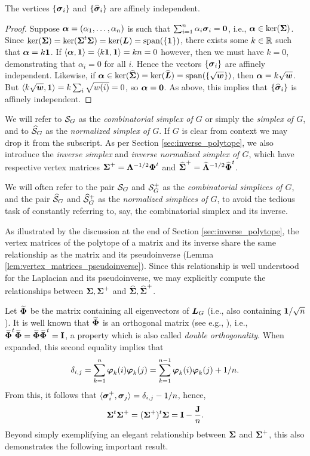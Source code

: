 \begin{lemma}
\label{lem:sv_affine_indep}
The vertices $\{\vb*{\sigma}_i\}$  and $\{\widehat{\vb*{\sigma}}_i\}$ are affinely independent. 
\end{lemma}
\begin{proof}
Suppose $\vb*{\alpha} = (\alpha_1,\dots,\alpha_n)$ is such that 
$\sum_{i=1}^n \alpha_i\vb*{\sigma}_i = \vb{0}$, i.e., $\vb*{\alpha}\in\ker(\boldsymbol{\Sigma})$. Since $\ker(\boldsymbol{\Sigma})=\ker(\boldsymbol{\Sigma}^t\boldsymbol{\Sigma})=\ker(\vb*{L})=\textnormal{span}(\{\vb{1}\})$, there exists some $k\in \mathbb{R}$ such that $\vb*{\alpha}=k\vb{1}$. If $\langle \vb*{\alpha},\vb{1}\rangle = \langle k\vb{1},\vb{1}\rangle=kn=0$ however, then we must have $k=0$, demonstrating that $\alpha_i=0$ for all $i$. Hence the vectors $\{\vb*{\sigma}_i\}$ are affinely independent. Likewise, if $\vb*{\alpha}\in\ker(\widehat{\boldsymbol{\Sigma}})=\ker(\widehat{\vb*{L}})=\textnormal{span}(\{\sqrt{\vb*{w}}\})$, then $\vb*{\alpha}=k\sqrt{\vb*{w}}$. But $\langle k\sqrt{\vb*{w}},\vb{1}\rangle = k\sum_{i}\sqrt{w(i)}=0$, so $\vb*{\alpha}=\vb{0}$. As above, this implies that $\{\widehat{\vb*{\sigma}}_i\}$ is affinely  independent. 
\end{proof}

We will refer to $\mathcal{S}_G$ as the \emph{combinatorial simplex of $G$} or simply the \emph{simplex of $G$}, and to $\widehat{\mathcal{S}}_G$ as the \emph{normalized simplex of $G$}. If $G$ is clear from context we may drop it from the subscript. As per Section \ref{sec:inverse_polytope}, we also introduce the \emph{inverse simplex} and \emph{inverse normalized simplex of $G$}, which have respective vertex matrices $\boldsymbol{\Sigma}^+ = \vb{\Lambda}^{-1/2}\boldsymbol{\Phi}^t$ and $\widehat{\boldsymbol{\Sigma}}^+ = \widehat{\vb{\Lambda}}^{-1/2}\widehat{\boldsymbol{\Phi}}^t$.  

We will often refer to the pair $\mathcal{S}_G$ and $\mathcal{S}_G^+$ as the \emph{combinatorial simplices of $G$}, and the pair $\widehat{\mathcal{S}}_G$ and $\widehat{\mathcal{S}}_G^+$ as the \emph{normalized simplices of $G$}, to avoid the tedious task of constantly referring to, say, the combinatorial simplex and its inverse. 

As illustrated by the discussion at the end of Section \ref{sec:inverse_polytope}, the vertex matrices of the polytope of a matrix and its inverse share the same relationship as the matrix and its pseudoinverse (Lemma \ref{lem:vertex_matrices_pseudoinverse}). Since this relationship is well understood for the Laplacian and its pseudoinverse, we may explicitly compute the relationships between $\boldsymbol{\Sigma},\boldsymbol{\Sigma}^+$ and $\widehat{\boldsymbol{\Sigma}},\widehat{\boldsymbol{\Sigma}}^+$. 

Let $\widetilde{\boldsymbol{\Phi}}$ be the matrix containing all eigenvectors of $\vb*{L}_G$ (i.e., also containing $\vb{1}/\sqrt{n}$).  It is well known that $\widetilde{\boldsymbol{\Phi}}$ is an orthogonal matrix (see e.g., \cite{van2013double}), i.e., $\widetilde{\boldsymbol{\Phi}}^t \widetilde{\boldsymbol{\Phi}}=\widetilde{\boldsymbol{\Phi}}\widetilde{\boldsymbol{\Phi}}^t=\vb{I}$, a property which is also called \emph{double orthogonality}. When expanded, this second equality implies that
\begin{equation}
\label{eq:sum_double_ortho}
\delta_{i,j}=\sum_{k=1}^n \vb*{\varphi}_k(i)\vb*{\varphi}_k(j) = \sum_{k=1}^{n-1} \vb*{\varphi}_k(i)\vb*{\varphi}_k(j) + 1/n.
\end{equation}
From this, it follows that $\langle\vb*{\sigma}_i^+,\vb*{\sigma}_j\rangle = \delta_{i,j} - 1/n$, 
hence, 
\begin{equation}
\label{eq:sv+sv}
    \boldsymbol{\Sigma}^t\boldsymbol{\Sigma}^+=(\boldsymbol{\Sigma}^+)^t\boldsymbol{\Sigma}=\vb{I}-\frac{\vb{J}}{n}.
\end{equation}
Beyond simply exemplifying an elegant relationship between $\boldsymbol{\Sigma}$ and $\boldsymbol{\Sigma}^+$, this also demonstrates the following important result. 

